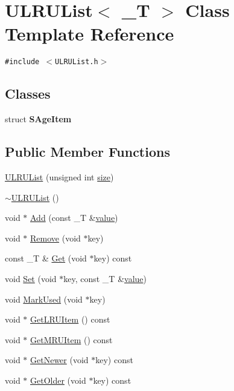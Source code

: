 \hypertarget{class_u_l_r_u_list}{
\section{ULRUList$<$ \_\-T $>$ Class Template Reference}
\label{class_u_l_r_u_list}
}
{\tt \#include $<$ULRUList.h$>$}

\subsection*{Classes}
\begin{CompactItemize}
\item 
struct \textbf{SAgeItem}
\end{CompactItemize}
\subsection*{Public Member Functions}
\begin{CompactItemize}
\item 
\hyperlink{class_u_l_r_u_list_60617daad530159dfed2bbcdb494897f}{ULRUList} (unsigned int \hyperlink{glext__bak_8h_3d1e3edfcf61ca2d831883e1afbad89e}{size})
\item 
\hyperlink{class_u_l_r_u_list_5c563d56e84b57d8f29d48ef9df2260e}{$\sim$ULRUList} ()
\item 
void $\ast$ \hyperlink{class_u_l_r_u_list_10c9b1c206a3dc2acf5e688ac21fa97a}{Add} (const \_\-T \&\hyperlink{glext__bak_8h_6a4f8a1a444e9080b297963b3db29fe0}{value})
\item 
void $\ast$ \hyperlink{class_u_l_r_u_list_a907bd91d86f83c36cc75febf2a94c03}{Remove} (void $\ast$key)
\item 
const \_\-T \& \hyperlink{class_u_l_r_u_list_7d10feee35c0cc4946e21347ef6cb3d2}{Get} (void $\ast$key) const 
\item 
void \hyperlink{class_u_l_r_u_list_7b8b53b874e87051b88f0ea688c9ae4a}{Set} (void $\ast$key, const \_\-T \&\hyperlink{glext__bak_8h_6a4f8a1a444e9080b297963b3db29fe0}{value})
\item 
void \hyperlink{class_u_l_r_u_list_ded91108c238c0886b0610b491d09894}{MarkUsed} (void $\ast$key)
\item 
void $\ast$ \hyperlink{class_u_l_r_u_list_3871983b8a1a2b18217bca744e00dc55}{GetLRUItem} () const 
\item 
void $\ast$ \hyperlink{class_u_l_r_u_list_bfe1f6cb202121429771b13bc90d6e91}{GetMRUItem} () const 
\item 
void $\ast$ \hyperlink{class_u_l_r_u_list_1ce92559ced183f4cece749b937dda2e}{GetNewer} (void $\ast$key) const 
\item 
void $\ast$ \hyperlink{class_u_l_r_u_list_66a73df62b1d9ee5cc3b42c22d38374b}{GetOlder} (void $\ast$key) const 
\end{CompactItemize}


